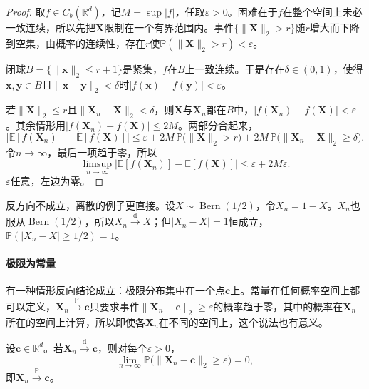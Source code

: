 \begin{proof}
取$f\in C_b(\mathbb{R}^{d})$，记$M=\sup\lvert f\rvert$，任取$\varepsilon>0$。困难在于$f$在整个空间上未必一致连续，所以先把$\bm{X}$限制在一个有界范围内。事件$\{\lVert\bm{X}\rVert_2>r\}$随$r$增大而下降到空集，由概率的连续性，存在$r$使$\mathbb{P}(\lVert\bm{X}\rVert_2>r)<\varepsilon$。

闭球$B=\{\lVert\bm{x}\rVert_2\leq r+1\}$是紧集，$f$在$B$上一致连续。于是存在$\delta\in(0,1)$，使得$\bm{x},\bm{y}\in B$且$\lVert\bm{x}-\bm{y}\rVert_2<\delta$时$\lvert f(\bm{x})-f(\bm{y})\rvert<\varepsilon$。

若$\lVert\bm{X}\rVert_2\leq r$且$\lVert\bm{X}_n-\bm{X}\rVert_2<\delta$，则$\bm{X}$与$\bm{X}_n$都在$B$中，$\lvert f(\bm{X}_n)-f(\bm{X})\rvert<\varepsilon$。其余情形用$\lvert f(\bm{X}_n)-f(\bm{X})\rvert\leq2M$。两部分合起来，
\[
 \bigl\lvert\mathbb{E}[f(\bm{X}_n)]-\mathbb{E}[f(\bm{X})]\bigr\rvert
 \leq\varepsilon+2M\,\mathbb{P}\bigl(\lVert\bm{X}\rVert_2>r\bigr)+2M\,\mathbb{P}\bigl(\lVert\bm{X}_n-\bm{X}\rVert_2\geq\delta\bigr) .
\]
令$n\to\infty$，最后一项趋于零，所以
\[
 \limsup_{n\to\infty}\bigl\lvert\mathbb{E}[f(\bm{X}_n)]-\mathbb{E}[f(\bm{X})]\bigr\rvert\leq\varepsilon+2M\varepsilon .
\]
$\varepsilon$任意，左边为零。
\end{proof}

反方向不成立，离散的例子更直接。设$X\sim\operatorname{Bern}(1/2)$，令$X_n=1-X$。$X_n$也服从$\operatorname{Bern}(1/2)$，所以$X_n\xrightarrow{\mathrm{d}}X$；但$\lvert X_n-X\rvert=1$恒成立，$\mathbb{P}(\lvert X_n-X\rvert\geq1/2)=1$。

\paragraph{极限为常量}
有一种情形反向结论成立：极限分布集中在一个点$\bm{c}$上。常量在任何概率空间上都可以定义，$\bm{X}_n\xrightarrow{\mathbb{P}}\bm{c}$只要求事件$\lVert\bm{X}_n-\bm{c}\rVert_2\geq\varepsilon$的概率趋于零，其中的概率在$\bm{X}_n$所在的空间上计算，所以即使各$\bm{X}_n$在不同的空间上，这个说法也有意义。

\begin{theorem}[依分布趋于常量]
\label{thm:weak-constant-limit}
设$\bm{c}\in\mathbb{R}^{d}$。若$\bm{X}_n\xrightarrow{\mathrm{d}}\bm{c}$，则对每个$\varepsilon>0$，
\begin{equation}
 \lim_{n\to\infty}\mathbb{P}\bigl(\lVert\bm{X}_n-\bm{c}\rVert_2\geq\varepsilon\bigr)=0 ,
 \label{eq:weak-constant-limit}
\end{equation}
即$\bm{X}_n\xrightarrow{\mathbb{P}}\bm{c}$。
\end{theorem}

